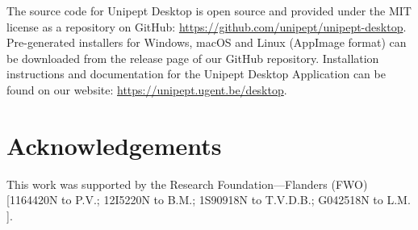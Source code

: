 The source code for Unipept Desktop is open source and provided under
the MIT license as a repository on GitHub:
\url{https://github.com/unipept/unipept-desktop}. Pre-generated
installers for Windows, macOS and Linux (AppImage format) can be
downloaded from the release page of our GitHub repository. Installation
instructions and documentation for the Unipept Desktop Application can
be found on our website: \url{https://unipept.ugent.be/desktop}.

\hypertarget{acknowledgements-1}{%
\section{Acknowledgements}\label{acknowledgements-1}}

This work was supported by the Research Foundation---Flanders (FWO)
{[}1164420N to P.V.; 12I5220N to B.M.; 1S90918N to T.V.D.B.; G042518N to
L.M. {]}.
